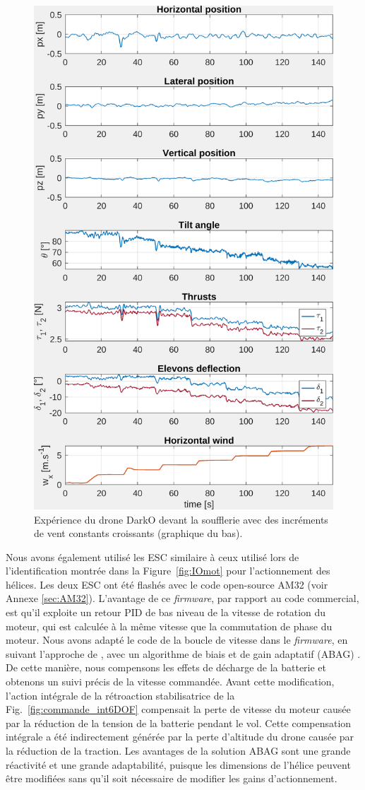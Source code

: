 \begin{figure}[ht!]
    \centering
    \includegraphics[trim=0cm 0cm 0cm 0cm,clip,width=0.6\columnwidth]{figures/exp_systune_struct.png}
    \caption{Expérience du drone DarkO devant la soufflerie avec des incréments de vent constants croissants (graphique du bas).}
    \label{fig:ExpSytuneStruct}
\end{figure}

Nous avons également utilisé les ESC similaire à ceux utilisé lors de l'identification montrée dans la Figure~\ref{fig:IOmot} pour l'actionnement des hélices. Les deux ESC ont été flashés avec le code open-source AM32 (voir Annexe \ref{sec:AM32}). L'avantage de ce \textit{firmware}, par rapport au code commercial, est qu'il exploite un retour PID  de bas niveau de la vitesse de rotation du moteur, qui est calculée à la même vitesse que la commutation de phase du moteur. Nous avons adapté le code de la boucle de vitesse dans le \textit{firmware}, en suivant l'approche de \cite{franchi2017}, avec un algorithme de biais et de gain adaptatif (ABAG) . De cette manière, nous compensons les effets de décharge de la batterie et obtenons un suivi précis de la vitesse commandée. Avant cette modification, l'action intégrale de la rétroaction stabilisatrice de la Fig.~\ref{fig:commande_int6DOF} compensait la perte de vitesse du moteur causée par la réduction de la tension de la batterie pendant le vol. Cette compensation intégrale a été indirectement générée par la perte d'altitude du drone causée par la réduction de la traction. Les avantages de la solution ABAG sont une grande réactivité et une grande adaptabilité, puisque les dimensions de l'hélice peuvent être modifiées sans qu'il soit nécessaire de modifier les gains d'actionnement.

